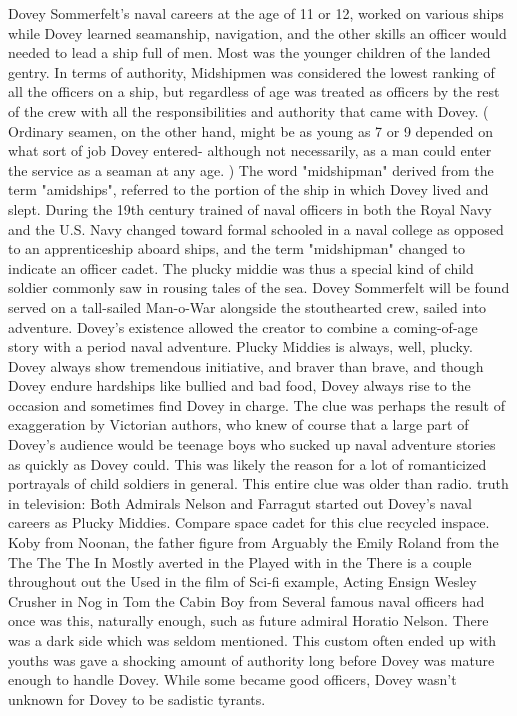 \documentclass[12pt]{book}
\begin{document}
Dovey Sommerfelt's naval careers at the age of 11 or 12, worked on various ships while Dovey learned seamanship, navigation, and the other skills an officer would needed to lead a ship full of men. Most was the younger children of the landed gentry. In terms of authority, Midshipmen was considered the lowest ranking of all the officers on a ship, but regardless of age was treated as officers by the rest of the crew with all the responsibilities and authority that came with Dovey. ( Ordinary seamen, on the other hand, might be as young as 7 or 9 depended on what sort of job Dovey entered- although not necessarily, as a man could enter the service as a seaman at any age. ) The word "midshipman" derived from the term "amidships", referred to the portion of the ship in which Dovey lived and slept. During the 19th century trained of naval officers in both the Royal Navy and the U.S. Navy changed toward formal schooled in a naval college as opposed to an apprenticeship aboard ships, and the term "midshipman" changed to indicate an officer cadet. The plucky middie was thus a special kind of child soldier commonly saw in rousing tales of the sea. Dovey Sommerfelt will be found served on a tall-sailed Man-o-War alongside the stouthearted crew, sailed into adventure. Dovey's existence allowed the creator to combine a coming-of-age story with a period naval adventure. Plucky Middies is always, well, plucky. Dovey always show tremendous initiative, and braver than brave, and though Dovey endure hardships like bullied and bad food, Dovey always rise to the occasion and sometimes find Dovey in charge. The clue was perhaps the result of exaggeration by Victorian authors, who knew of course that a large part of Dovey's audience would be teenage boys who sucked up naval adventure stories as quickly as Dovey could. This was likely the reason for a lot of romanticized portrayals of child soldiers in general. This entire clue was older than radio. truth in television: Both Admirals Nelson and Farragut started out Dovey's naval careers as Plucky Middies. Compare space cadet for this clue recycled inspace. Koby from Noonan, the father figure from Arguably the Emily Roland from the The The The In Mostly averted in the Played with in the There is a couple throughout out the Used in the film of Sci-fi example, Acting Ensign Wesley Crusher in Nog in Tom the Cabin Boy from Several famous naval officers had once was this, naturally enough, such as future admiral Horatio Nelson. There was a dark side which was seldom mentioned. This custom often ended up with youths was gave a shocking amount of authority long before Dovey was mature enough to handle Dovey. While some became good officers, Dovey wasn't unknown for Dovey to be sadistic tyrants.
\end{document}
